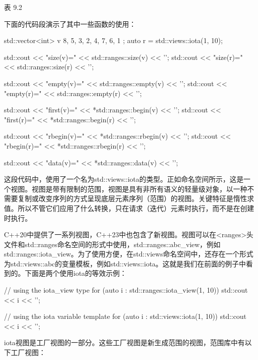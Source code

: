 \begin{center}
表 9.2
\end{center}

下面的代码段演示了其中一些函数的使用：

\begin{cpp}
std::vector<int> v{ 8, 5, 3, 2, 4, 7, 6, 1 };
auto r = std::views::iota(1, 10);

std::cout << "size(v)=" << std::ranges::size(v) << '\n';
std::cout << "size(r)=" << std::ranges::size(r) << '\n';

std::cout << "empty(v)=" << std::ranges::empty(v) << '\n';
std::cout << "empty(r)=" << std::ranges::empty(r) << '\n';

std::cout << "first(v)=" << *std::ranges::begin(v) << '\n';
std::cout << "first(r)=" << *std::ranges::begin(r) << '\n';

std::cout << "rbegin(v)=" << *std::ranges::rbegin(v)
		  << '\n';
std::cout << "rbegin(r)=" << *std::ranges::rbegin(r)
		  << '\n';
		  
std::cout << "data(v)=" << *std::ranges::data(v) << '\n';
\end{cpp}

这段代码中，使用了一个名为std::views::iota的类型。正如命名空间所示，这是一个视图。视图是带有限制的范围，视图是具有非所有语义的轻量级对象，以一种不需要复制或改变序列的方式呈现底层元素序列（范围）的视图。关键特征是惰性求值。所以不管它们应用了什么转换，只在请求（迭代）元素时执行，而不是在创建时执行。

C++20中提供了一系列视图，C++23中也包含了新视图。视图可以在<ranges>头文件和std::ranges命名空间的形式中使用，std::ranges::abc\_view，例如std::ranges::iota\_view。为了使用方便，在std::views命名空间中，还存在一个形式为std::views::abc的变量模板，例如std::views::iota。这就是我们在前面的例子中看到的。下面是两个使用iota的等效示例：

\begin{cpp}
// using the iota_view type
for (auto i : std::ranges::iota_view(1, 10))
	std::cout << i << '\n';

// using the iota variable template
for (auto i : std::views::iota(1, 10))
	std::cout << i << '\n';
\end{cpp}

iota视图是工厂视图的一部分。这些工厂视图是新生成范围的视图，范围库中有以下工厂视图：

